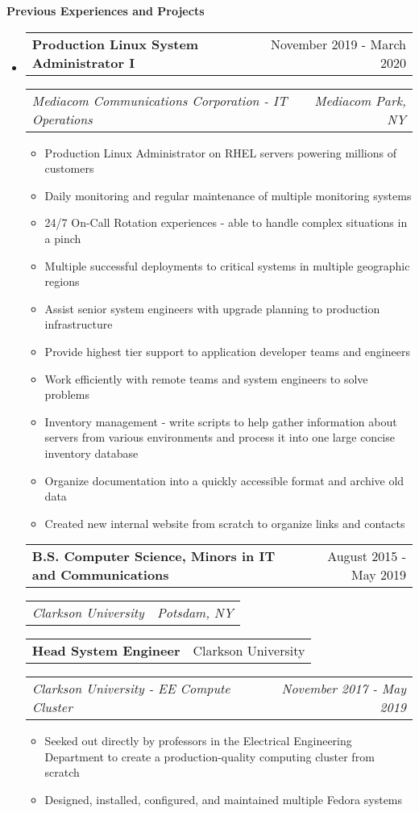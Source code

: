 \documentclass[letterpaper,12pt]{article}
\makeatletter
\newcommand{\resitem}[1]{\item #1 \vspace{-3pt}}
\newcommand{\resheading}[1]{{\large {\textbf{#1 \vphantom{p\^{E}}}}}\vspace{-3pt}}
\newcommand{\topheading}[2]{
\begin{tabular*}{6.5in}{l@{\extracolsep{\fill}}r}
		\textbf{#1} & #2 \\
\end{tabular*}}
\newcommand{\bottomheading}[2]{
\begin{tabular*}{6.5in}{l@{\extracolsep{\fill}}r}
		\textit{#1} & \textit{#2} \\
\end{tabular*}\vspace{-6pt}}
\makeatother
\begin{document}
\resheading{Previous Experiences and Projects}
\begin{itemize}
	\item[]

	\topheading{Production Linux System Administrator I}{November 2019 - March 2020}
	\bottomheading{Mediacom Communications Corporation - IT Operations}{Mediacom Park, NY}
	\begin{itemize}
		\resitem{Production Linux Administrator on RHEL servers powering millions of customers}
		\resitem{Daily monitoring and regular maintenance of multiple monitoring systems}
		\resitem{24/7 On-Call Rotation experiences - able to handle complex situations in a pinch}
		\resitem{Multiple successful deployments to critical systems in multiple geographic regions}
		\resitem{Assist senior system engineers with upgrade planning to production infrastructure}
		\resitem{Provide highest tier support to application developer teams and engineers}
		\resitem{Work efficiently with remote teams and system engineers to solve problems}
		\resitem{Inventory management - write scripts to help gather information about servers from various environments and process it into one large concise inventory database}
		\resitem{Organize documentation into a quickly accessible format and archive old data}
		\resitem{Created new internal website from scratch to organize links and contacts}
	\end{itemize}

	\vspace{6pt}

	\topheading{B.S. Computer Science, Minors in IT and Communications}{August 2015 - May 2019}
	\bottomheading{Clarkson University}{Potsdam, NY}

	\vspace{6pt}

	\topheading{Head System Engineer}{Clarkson University}
	\bottomheading{Clarkson University - EE Compute Cluster}{November 2017 - May 2019}
	\begin{itemize}
		\resitem{Seeked out directly by professors in the Electrical Engineering Department to create a production-quality computing cluster from scratch}
		\resitem{Designed, installed, configured, and maintained multiple Fedora systems}
	\end{itemize}


\end{itemize}
\end{document}
